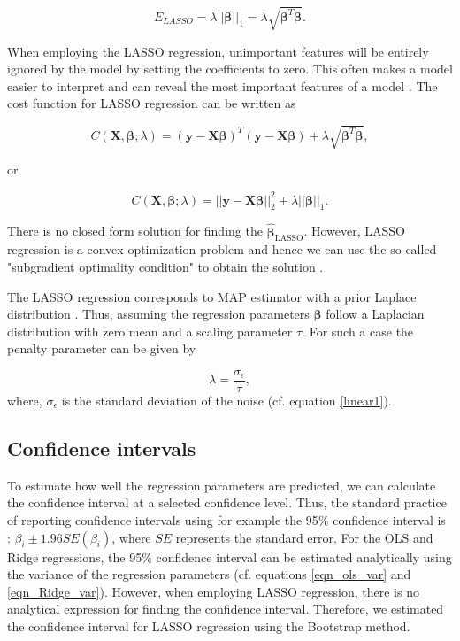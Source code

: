 \documentclass[a4paper]{article}
\begin{document}
\begin{equation}
    E_{LASSO}= \lambda ||\boldsymbol{\beta}||_1 = \lambda \sqrt{\boldsymbol{\beta}^T\boldsymbol{\beta}}.
\end{equation}

When employing the LASSO regression, unimportant features will be entirely ignored by the model by setting the coefficients to zero. This often makes a model easier to interpret and can reveal the most important features of a model \cite{Guido}. The cost function for LASSO regression can be written as

\begin{equation}
    C(\mathbf{X}, \boldsymbol{\beta}; \lambda) = (\mathbf{y}-\mathbf{X}\boldsymbol{\beta})^T(\mathbf{y}-\mathbf{X}\boldsymbol{\beta}) + \lambda \sqrt{\boldsymbol{\beta}^T\boldsymbol{\beta}},
\end{equation}


or


\begin{equation}
    C(\mathbf{X},\boldsymbol{\beta};\lambda)=
    \vert\vert\mathbf{y}-\mathbf{X}\boldsymbol{\beta}\vert\vert_2^2+\lambda\vert\vert \boldsymbol{\beta}\vert\vert_1.
\end{equation}

There is no closed form solution for finding the $\hat{\boldsymbol{\beta}}_{\text{LASSO}}$. However, LASSO regression is a convex optimization problem and hence we can use the so-called "subgradient optimality condition" to obtain the solution \cite{Pankaj}. 

The LASSO regression corresponds to MAP estimator with a prior Laplace distribution \cite{Pankaj}. Thus, assuming the regression parameters $\boldsymbol{\beta}$ follow a Laplacian distribution with zero mean and a scaling parameter $\tau$. For such a case the penalty parameter can be given by

\begin{equation}
    \lambda = \frac{\sigma_{\epsilon}}{\tau},
    \label{lambda-var2}
\end{equation}
where, $\sigma_{\epsilon}$ is the standard deviation of the noise (cf. equation \ref{linear1}).

\subsection{Confidence intervals}

To estimate how well the regression parameters are predicted, we can calculate the confidence interval at a selected confidence level. Thus, the standard practice of reporting confidence intervals using for example the 95$\%$ confidence interval is \cite{hastie}: ${\beta}_i \pm 1.96 SE({\beta}_i)$, where $SE$ represents the standard error. For the OLS and Ridge regressions, the 95$\%$ confidence interval can be estimated analytically using the variance of the regression parameters (cf. equations \ref{eqn_ols_var} and \ref{eqn_Ridge_var}). However, when employing LASSO regression, there is no analytical expression for finding the confidence interval. Therefore, we estimated the confidence interval for LASSO regression using the Bootstrap method. 
\end{document}
